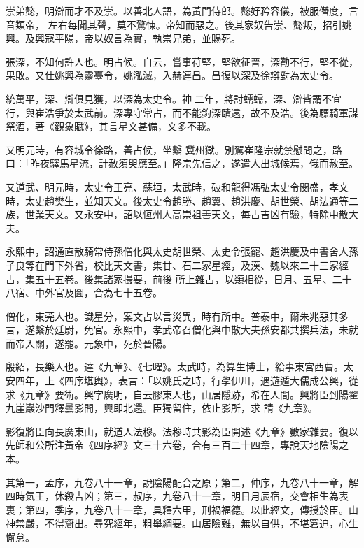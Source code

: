 \begin{pinyinscope}
 崇弟懿，明辯而才不及崇。以善北人語，為黃門侍郎。懿好矜容儀，被服僭度，言音類帝，
 左右每聞其聲，莫不驚悚。帝知而惡之。後其家奴告崇、懿叛，招引姚興。及興寇平陽，帝以奴言為實，執崇兄弟，並賜死。



 張深，不知何許人也。明占候。自云，嘗事苻堅，堅欲征晉，深勸不行，堅不從，果敗。又仕姚興為靈臺令，姚泓滅，入赫連昌。昌復以深及徐辯對為太史令。



 統萬平，深、辯俱見獲，以深為太史令。神二年，將討蠕蠕，深、辯皆謂不宜行，與崔浩爭於太武前。深專守常占，而不能鉤深賾遠，故不及浩。後為驃騎軍謀祭酒，著《觀象賦》，其言星文甚備，文多不載。



 又明元時，有容城令徐路，善占候，坐繫
 冀州獄。別駕崔隆宗就禁慰問之，路曰：「昨夜驛馬星流，計赦須臾應至。」隆宗先信之，遂遣人出城候焉，俄而赦至。



 又道武、明元時，太史令王亮、蘇垣，太武時，破和龍得馮弘太史令閔盛，孝文時，太史趙樊生，並知天文。後太史令趙勝、趙翼、趙洪慶、胡世榮、胡法通等二族，世業天文。又永安中，詔以恆州人高崇祖善天文，每占吉凶有驗，特除中散大夫。



 永熙中，詔通直散騎常侍孫僧化與太史胡世榮、太史令張寵、趙洪慶及中書舍人孫子良等在門下外省，校比天文書，集甘、石二家星經，及漢、魏以來二十三家經占，集五十五卷。後集諸家撮要，前後
 所上雜占，以類相從，日月、五星、二十八宿、中外官及圖，合為七十五卷。



 僧化，東莞人也。識星分，案文占以言災異，時有所中。普泰中，爾朱兆惡其多言，遂繫於廷尉，免官。永熙中，孝武帝召僧化與中散大夫孫安都共撰兵法，未就而帝入關，遂罷。元象中，死於晉陽。



 殷紹，長樂人也。達《九章》、《七曜》。太武時，為算生博士，給事東宮西曹。太安四年，上《四序堪輿》，表言：「以姚氏之時，行學伊川，遇遊遁大儒成公興，從求《九章》要術。興字廣明，自云膠東人也，山居隱跡，希在人間。興將臣到陽翟九崖巖沙門釋曇影間，興即北還。臣獨留住，依止影所，求
 請《九章》。



 影復將臣向長廣東山，就道人法穆。法穆時共影為臣開述《九章》數家雜要。復以先師和公所注黃帝《四序經》文三十六卷，合有三百二十四章，專說天地陰陽之本。



 其第一，孟序，九卷八十一章，說陰陽配合之原；第二，仲序，九卷八十一章，解四時氣王，休殺吉凶；第三，叔序，九卷八十一章，明日月辰宿，交會相生為表裏；第四，季序，九卷八十一章，具釋六甲，刑禍福德。以此經文，傳授於臣。山神禁嚴，不得齎出。尋究經年，粗舉綱要。山居險難，無以自供，不堪窘迫，心生懈怠。




\end{pinyinscope}
